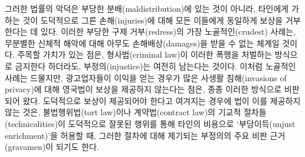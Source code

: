 그러한 법률의 악덕은 부당한 분배(maldistribution)에 있는 것이 아니라,
타인에게 가하는 것이 도덕적으로 그른 손해(injuries)에 대해 모든 이들에게
동일하게 보상을 거부한다는 데 있다. 이러한 부당한 구제 거부(redress)의
가장 노골적인(crudest) 사례는, 무분별한 신체적 해악에 대해 아무도
손해배상(damages)을 받을 수 없는 체계일 것이다. 주목할 가치가 있는 점은,
형사법(criminal law)이 이러한 폭행을 처벌하는 방식으로 금지한다
하더라도,  부정의(injustice)는 여전히 남는다는 것이다.
이처럼 노골적인 사례는 드물지만, 광고업자들이 이익을 얻는 경우가 많은
사생활 침해(invasions of privacy)에 대해 영국법이 보상을 제공하지
않는다는 점은, 종종 이러한 방식으로 비판되어 왔다. 도덕적으로 보상이
제공되어야 한다고 여겨지는 경우에 법이 이를 제공하지 않는 것은,
불법행위법(tort law)이나 계약법(contract law)의 기교적
절차들(technicalities)이 도덕적으로 잘못된 행위를 통해 타인의 비용으로
`부당이득(unjust enrichment)'을 허용할 때, 그러한 절차에 대해 제기되는
부정의의 주요 비판 근거(gravamen)이 되기도 한다.

